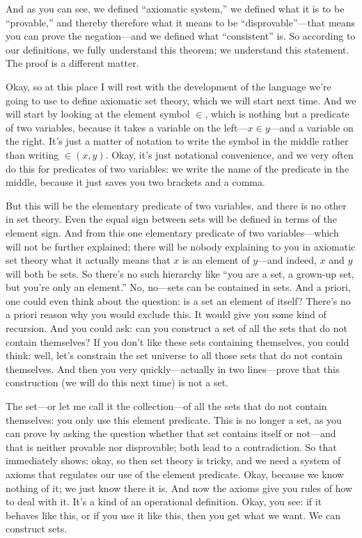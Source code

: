 And as you can see, we defined ``axiomatic system,'' we defined what it is to be ``provable,'' and thereby therefore what it means to be ``disprovable''---that means you can prove the negation---and we defined what ``consistent'' is. So according to our definitions, we fully understand this theorem; we understand this statement. The proof is a different matter.

Okay, so at this place I will rest with the development of the language we're going to use to define axiomatic set theory, which we will start next time. And we will start by looking at the element symbol $\in$, which is nothing but a predicate of two variables, because it takes a variable on the left---$x \in y$---and a variable on the right. It's just a matter of notation to write the symbol in the middle rather than writing $\in(x, y)$. Okay, it's just notational convenience, and we very often do this for predicates of two variables: we write the name of the predicate in the middle, because it just saves you two brackets and a comma.

But this will be the elementary predicate of two variables, and there is no other in set theory. Even the equal sign between sets will be defined in terms of the element sign. And from this one elementary predicate of two variables---which will not be further explained; there will be nobody explaining to you in axiomatic set theory what it actually means that $x$ is an element of $y$---and indeed, $x$ and $y$ will both be sets. So there's no such hierarchy like ``you are a set, a grown-up set, but you're only an element.'' No, no---sets can be contained in sets. And a priori, one could even think about the question: is a set an element of itself? There's no a priori reason why you would exclude this. It would give you some kind of recursion. And you could ask: can you construct a set of all the sets that do not contain themselves? If you don't like these sets containing themselves, you could think: well, let's constrain the set universe to all those sets that do not contain themselves. And then you very quickly---actually in two lines---prove that this construction (we will do this next time) is not a set.

The set---or let me call it the collection---of all the sets that do not contain themselves: you only use this element predicate. This is no longer a set, as you can prove by asking the question whether that set contains itself or not---and that is neither provable nor disprovable; both lead to a contradiction. So that immediately shows: okay, so then set theory is tricky, and we need a system of axioms that regulates our use of the element predicate. Okay, because we know nothing of it; we just know there it is. And now the axioms give you rules of how to deal with it. It's a kind of an operational definition. Okay, you see: if it behaves like this, or if you use it like this, then you get what we want. We can construct sets.


